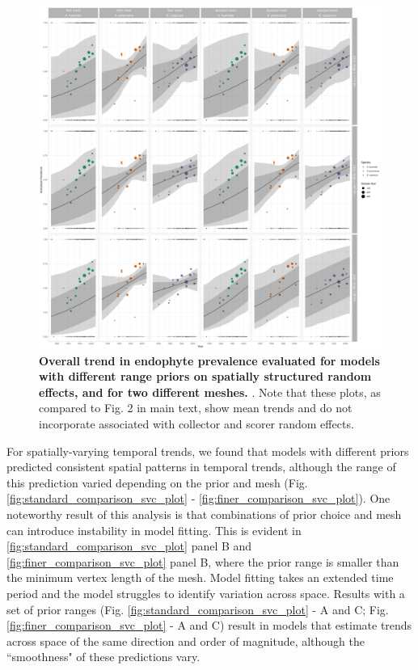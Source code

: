 \documentclass[11pt]{article}
\newcommand{\firstrevise}[1]{{\color{black}{#1}}}
\begin{document}
\begin{figure}[H]
	\centering
	\includegraphics[width = \linewidth]{../Plots/prior_comparison_year_plot.png}
	\caption[Overall trend in endophyte prevalence evaluated for endophyte prevalence models with different range priors on spatially structured random effects, and for two different meshes]{\textbf{Overall trend in endophyte prevalence evaluated for \firstrevise{endophyte prevalence} models with different range priors on spatially structured random effects, and for two different \firstrevise{triangulation} meshes.} \firstrevise{Data used in model fitting is the same across all panels and as in the main text}. Note that these plots, as compared to Fig. 2 in main text, show mean trends and do not incorporate \firstrevise{variance} associated with collector and scorer random effects.}
	\label{fig:prior_year_plot}
\end{figure}

For spatially-varying temporal trends, we found that models with different priors predicted consistent spatial patterns in temporal trends, although the range of this prediction varied depending on the prior and mesh (Fig. \ref{fig:standard_comparison_svc_plot} - \ref{fig:finer_comparison_svc_plot}). 
One noteworthy result of this analysis is that combinations of prior choice and mesh can introduce instability in model fitting. This is evident in \ref{fig:standard_comparison_svc_plot} panel B and \ref{fig:finer_comparison_svc_plot} panel B, where the prior range is smaller than the minimum vertex length of the mesh.
Model fitting takes an extended time period and the model struggles to identify variation across space. Results with a set of prior ranges (Fig. \ref{fig:standard_comparison_svc_plot} -  A and C; Fig. \ref{fig:finer_comparison_svc_plot} - A and C) result in models that estimate trends across space of the same direction and order of magnitude, although the ``smoothness" of these predictions vary.
\end{document}
